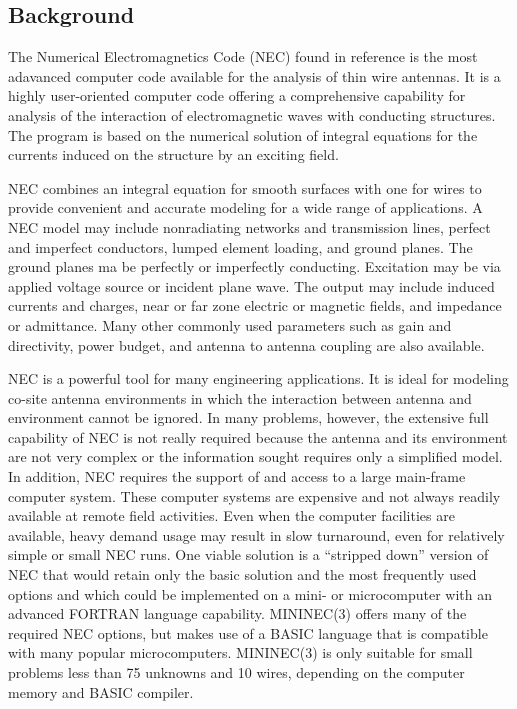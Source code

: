 \documentclass[12pt]{article}
\begin{document}
\subsection{Background}
The Numerical Electromagnetics Code (NEC) found in reference \cite{r4}
is the most adavanced computer code available for the analysis of thin
wire antennas. It is a highly user-oriented computer code offering a
comprehensive capability for analysis of the interaction of
electromagnetic waves with conducting structures. The program is based
on the numerical solution of integral equations for the currents induced
on the structure by an exciting field.

NEC combines an integral equation for smooth surfaces with one for wires
to provide convenient and accurate modeling for a wide range of
applications. A NEC model may include nonradiating networks and
transmission lines, perfect and imperfect conductors, lumped element
loading, and ground planes. The ground planes ma be perfectly or
imperfectly conducting. Excitation may be via applied voltage source or
incident plane wave. The output may include induced currents and
charges, near or far zone electric or magnetic fields, and impedance or
admittance. Many other commonly used parameters such as gain and
directivity, power budget, and antenna to antenna coupling are also
available.

NEC is a powerful tool for many engineering applications. It is ideal
for modeling co-site antenna environments in which the interaction
between antenna and environment cannot be ignored. In many problems,
however, the extensive full capability of NEC is not really required
because the antenna and its environment are not very complex or the
information sought requires only a simplified model. In addition, NEC
requires the support of and access to a large main-frame computer
system. These computer systems are expensive and not always readily
available at remote field activities. Even when the computer facilities
are available, heavy demand usage may result in slow turnaround, even
for relatively simple or small NEC runs. One viable solution is a
``stripped down'' version of NEC that would retain only the basic
solution and the most frequently used options and which could be
implemented on a mini- or microcomputer with an advanced FORTRAN
language capability. MININEC(3) offers many of the required NEC options,
but makes use of a BASIC language that is compatible with many popular
microcomputers. MININEC(3) is only suitable for small problems less than
75 unknowns and 10 wires, depending on the computer memory and BASIC
compiler.
\end{document}
